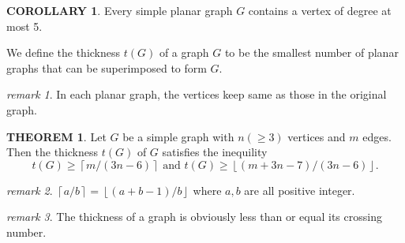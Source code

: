 \documentclass[a4paper,11pt]{article}%
\theoremstyle{remark}
\newtheorem*{remark}{remark}
\theoremstyle{definition}
\newtheorem{theorem}{THEOREM}[section]
\theoremstyle{definition}
\newtheorem{corollary}{COROLLARY}[section]
\theoremstyle{definition}
\theoremstyle{definition}
\theoremstyle{plain}
\theoremstyle{definition}
\begin{document}
\begin{corollary}
    Every simple planar graph $G$ contains a vertex of degree at most 5.
\end{corollary}
We define the thickness $t(G)$ of a graph $G$ to be the smallest number of planar graphs that can be superimposed to form $G$.
\begin{remark}
    In each planar graph, the vertices keep same as those in the original graph.
\end{remark}
\begin{theorem}
    Let $G$ be a simple graph with $n(\geq 3)$ vertices and $m$ edges. Then the thickness $t(G)$ of $G$ satisfies the inequility
    \[t(G)\geq\left\lceil m/(3n-6)\right\rceil \text{  and  }t(G)\geq\left\lfloor (m+3n-7)/(3n-6)\right\rfloor .\]
\end{theorem}
\begin{remark}
    $\left\lceil a/b\right\rceil =\left\lfloor (a+b-1)/b\right\rfloor $ where $a,b$ are all positive integer.
\end{remark}
\begin{remark}
    The thickness of a graph is obviously less than or equal its crossing number.
\end{remark}
\end{document}
